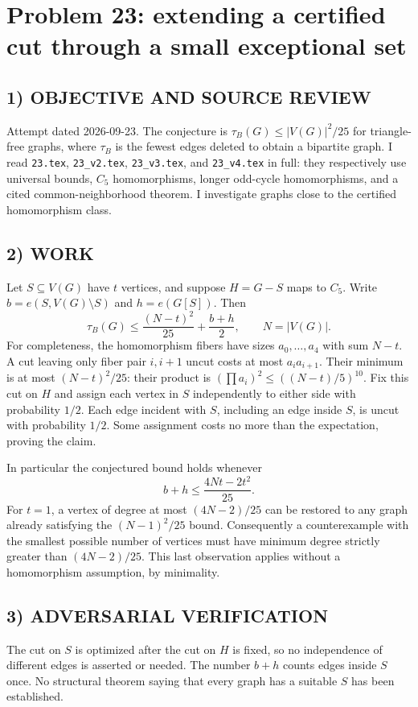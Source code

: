 \section{Problem 23: extending a certified cut through a small exceptional set}
\subsection*{1) OBJECTIVE AND SOURCE REVIEW}
Attempt dated 2026-09-23. The conjecture is $\tau_B(G)\le |V(G)|^2/25$ for triangle-free graphs, where $\tau_B$ is the fewest edges deleted to obtain a bipartite graph. I read \texttt{23.tex}, \texttt{23\_v2.tex}, \texttt{23\_v3.tex}, and \texttt{23\_v4.tex} in full: they respectively use universal bounds, $C_5$ homomorphisms, longer odd-cycle homomorphisms, and a cited common-neighborhood theorem. I investigate graphs close to the certified homomorphism class.
\subsection*{2) WORK}
Let $S\subseteq V(G)$ have $t$ vertices, and suppose $H=G-S$ maps to $C_5$. Write $b=e(S,V(G)\setminus S)$ and $h=e(G[S])$. Then
\[
\tau_B(G)\le\frac{(N-t)^2}{25}+\frac{b+h}{2},\qquad N=|V(G)|.
\]
For completeness, the homomorphism fibers have sizes $a_0,\ldots,a_4$ with sum $N-t$. A cut leaving only fiber pair $i,i+1$ uncut costs at most $a_ia_{i+1}$. Their minimum is at most $(N-t)^2/25$: their product is $(\prod a_i)^2\le((N-t)/5)^{10}$. Fix this cut on $H$ and assign each vertex in $S$ independently to either side with probability $1/2$. Each edge incident with $S$, including an edge inside $S$, is uncut with probability $1/2$. Some assignment costs no more than the expectation, proving the claim.

In particular the conjectured bound holds whenever
\[
b+h\le\frac{4Nt-2t^2}{25}.
\]
For $t=1$, a vertex of degree at most $(4N-2)/25$ can be restored to any graph already satisfying the $(N-1)^2/25$ bound. Consequently a counterexample with the smallest possible number of vertices must have minimum degree strictly greater than $(4N-2)/25$. This last observation applies without a homomorphism assumption, by minimality.
\subsection*{3) ADVERSARIAL VERIFICATION}
The cut on $S$ is optimized after the cut on $H$ is fixed, so no independence of different edges is asserted or needed. The number $b+h$ counts edges inside $S$ once. No structural theorem saying that every graph has a suitable $S$ has been established.

